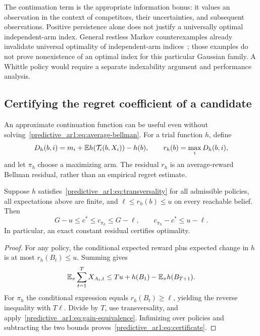 The continuation term is the appropriate information bonus: it values an observation in the context of competitors, their uncertainties, and subsequent observations. Positive persistence alone does not justify a universally optimal independent-arm index. General restless Markov counterexamples already invalidate universal optimality of independent-arm indices~\cite{collected29}; those examples do not prove nonexistence of an optimal index for this particular Gaussian family. A Whittle policy would require a separate indexability argument and performance analysis.

\subsection{Certifying the regret coefficient of a candidate}
\label{predictive_ar1:sec:certificate}
An approximate continuation function can be useful even without solving~\eqref{predictive_ar1:eq:average-bellman}. For a trial function $h$, define
\begin{equation}
D_h(b,i)=m_i+\mathbb E h(\mathcal T_i(b,X_i))-h(b),\qquad
r_h(b)=\max_iD_h(b,i),
\end{equation}
and let $\pi_h$ choose a maximizing arm. The residual $r_h$ is an average-reward Bellman residual, rather than an empirical regret estimate.

\begin{proposition}
Suppose $h$ satisfies~\eqref{predictive_ar1:eq:transversality} for all admissible policies, all expectations above are finite, and
$\ell\leq r_h(b)\leq u$ on every reachable belief. Then
\begin{equation}
G-u\leq c^*\leq c_{\pi_h}\leq G-\ell,\qquad
c_{\pi_h}-c^*\leq u-\ell.
\label{predictive_ar1:eq:certificate}
\end{equation}
In particular, an exact constant residual certifies optimality.
\end{proposition}
\begin{proof}
For any policy, the conditional expected reward plus expected change in $h$ is at most $r_h(B_t)\leq u$. Summing gives
\[
\mathbb E_\pi\sum_{t=1}^TX_{A_t,t}\leq Tu+h(B_1)-\mathbb E_\pi h(B_{T+1}).
\]
For $\pi_h$ the conditional expression equals $r_h(B_t)\geq\ell$, yielding the reverse inequality with $T\ell$. Divide by $T$, use transversality, and apply~\eqref{predictive_ar1:eq:gain-equivalence}. Infimizing over policies and subtracting the two bounds proves~\eqref{predictive_ar1:eq:certificate}.
\end{proof}

